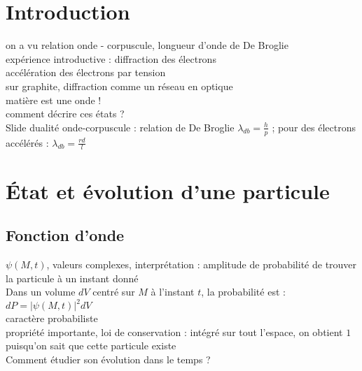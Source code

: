 


\biblio{}

\section*{Introduction}
on a vu relation onde - corpuscule, longueur d'onde de De Broglie \\
expérience introductive : diffraction des électrons \\
accélération des électrons par tension  \\
sur graphite, diffraction comme un réseau en optique \\
matière est une onde ! \\
comment décrire ces états ? \\

Slide dualité onde-corpuscule : relation de De Broglie $\lambda_{db}=\frac{h}{p}$ ; pour des électrons accélérés : $\lambda_{db}=\frac{rd}{l}$ \\


\section{État et évolution d'une particule}
\subsection{Fonction d'onde}
$\psi (M,t)$, valeurs complexes, interprétation : amplitude de probabilité de trouver la particule à un instant donné \\
Dans un volume $dV$ centré sur $M$ à l'instant $t$, la probabilité est : $dP=\lvert \psi(M,t) \lvert ^2  dV$ \\
caractère probabiliste \\
propriété importante, loi de conservation : intégré sur tout l'espace, on obtient $1$ puisqu'on sait que cette particule existe \\
 Comment étudier son évolution dans le temps ?  \\ 
